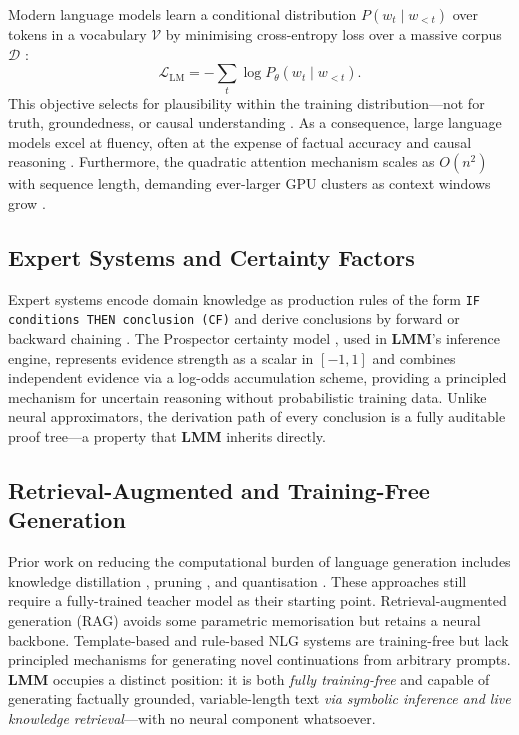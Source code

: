 \documentclass[11pt,a4paper]{article}
\newcommand{\lmm}{\texorpdfstring{%
  \textbf{\color{lmmAccent}LMM}}{LMM}}
\begin{document}
Modern language models learn a conditional distribution $P(w_t \mid w_{<t})$ over tokens in a
vocabulary $\mathcal{V}$ by minimising cross-entropy loss over a massive corpus
$\mathcal{D}$ \citep{radford2019language}:
\begin{equation}
  \mathcal{L}_{\mathrm{LM}} = -\sum_{t} \log P_\theta(w_t \mid w_{<t}).
  \label{eq:lm_loss}
\end{equation}
This objective selects for plausibility within the training distribution---not for truth,
groundedness, or causal understanding \citep{pearl2018book}. As a consequence, large language
models excel at fluency, often at the expense of factual accuracy \citep{bang2023multitask} and
causal reasoning \citep{kiciman2023causal}. Furthermore, the quadratic attention mechanism
scales as $O(n^2)$ with sequence length, demanding ever-larger GPU clusters as context windows
grow \citep{vaswani2017attention}.

\subsection{Expert Systems and Certainty Factors}

Expert systems encode domain knowledge as production rules of the form \texttt{IF conditions THEN
conclusion (CF)} and derive conclusions by forward or backward chaining
\citep{shortliffe1975mycin,buchanan1984rule}. The Prospector certainty model
\citep{duda1976model}, used in \lmm{}'s inference engine, represents evidence strength as a scalar
in $[-1, 1]$ and combines independent evidence via a log-odds accumulation scheme, providing a
principled mechanism for uncertain reasoning without probabilistic training data.
Unlike neural approximators, the derivation path of every conclusion is a fully auditable proof
tree---a property that \lmm{} inherits directly.

\subsection{Retrieval-Augmented and Training-Free Generation}

Prior work on reducing the computational burden of language generation includes knowledge
distillation \citep{hinton2015distilling}, pruning \citep{han2015learning}, and quantisation
\citep{dettmers2022llm}. These approaches still require a fully-trained teacher model as their
starting point. Retrieval-augmented generation (RAG) \citep{lewis2020retrieval} avoids some
parametric memorisation but retains a neural backbone. Template-based and rule-based NLG systems
\citep{reiter1997building} are training-free but lack principled mechanisms for generating novel
continuations from arbitrary prompts. \lmm{} occupies a distinct position: it is both
\emph{fully training-free} and capable of generating factually grounded, variable-length text
\emph{via symbolic inference and live knowledge retrieval}---with no neural component whatsoever.
\end{document}
